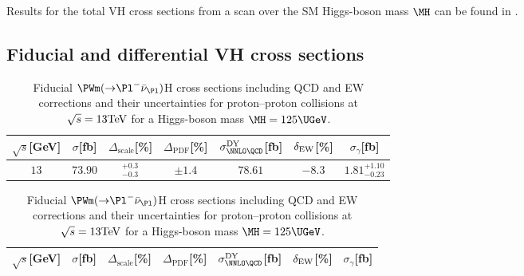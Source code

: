Results for the total VH cross sections from a scan over the SM Higgs-boson mass $\MH$ 
can be found in .

\subsection{Fiducial and differential VH cross sections}

\begin{table}
\caption{Fiducial $\PWp({\to}\Pl^+\nu_{\Pl})$H cross sections including QCD and EW corrections
and their uncertainties for proton--proton collisions at 
$\sqrt{s}=13\rm{TeV}$ for a Higgs-boson mass $\MH=125\UGeV$.}
\label{tab:wph_XSfiducial}
\begin{center}%
\begin{small}%
\begin{tabular}{ccccccc}%
\hline
$\sqrt{s}$[GeV] & $\sigma$[fb] & $\Delta_{\mathrm{scale}}$[\%] & $\Delta_{\mathrm{PDF}}$[\%] &
$\sigma_{\NNLO \QCD}^{\DY}$[fb] & $\delta_{\mathrm{EW}}$[\%] & $\sigma_{\gamma}$[fb]
\\
\hline
$13$ & $73.90$ & ${}_{-0.3}^{+ 0.3}$ & $\pm 1.4$ & $78.61$ & $-8.3$ & $1.81^{+1.10}_{-0.23}$ 
\\
\hline
\end{tabular}%
\end{small}%
\end{center}%
\vspace{2em}
\caption{Fiducial $\PWm({\to}\Pl^-\bar\nu_{\Pl})$H cross sections including QCD and EW corrections
and their uncertainties for proton--proton collisions at 
$\sqrt{s}=13\rm{TeV}$ for a Higgs-boson mass $\MH=125\UGeV$.}
\label{tab:wmh_XSfiducial}
\begin{center}%
\begin{small}%
\begin{tabular}{ccccccc}%
\hline
$\sqrt{s}$[GeV] & $\sigma$[fb] & $\Delta_{\mathrm{scale}}$[\%] & $\Delta_{\mathrm{PDF}}$[\%] &
$\sigma_{\NNLO \QCD}^{\DY}$[fb] & $\delta_{\mathrm{EW}}$[\%] & $\sigma_{\gamma}$[fb]
\\
\hline

\end{tabular}
\end{small}
\end{center}
\end{table}
